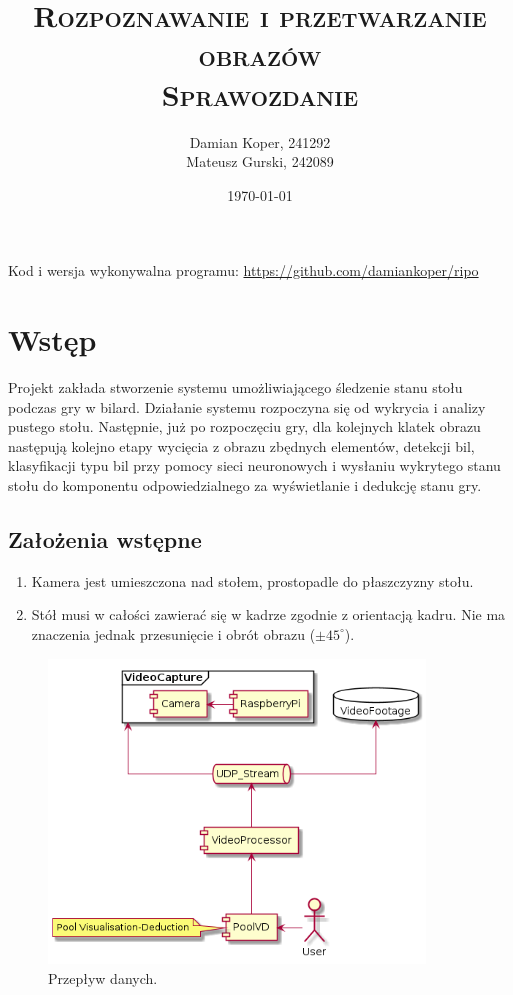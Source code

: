 \documentclass[12pt]{article}
\title{ 
    \vspace*{50mm}
    \textsc{
        \textbf{Rozpoznawanie i przetwarzanie obrazów}\\
        \large Sprawozdanie 
    }
}
\author{
Damian Koper,  241292\\
Mateusz Gurski, 242089
}
\date{\today}
\begin{document}
\maketitle

\newpage
\setcounter{tocdepth}{2}
\localtableofcontents
\listoffigures 
\lstlistoflistings
\vfill
Kod i wersja wykonywalna programu: \url{https://github.com/damiankoper/ripo}
\newpage

\section{Wstęp}
Projekt zakłada stworzenie systemu umożliwiającego śledzenie stanu stołu podczas gry w bilard. Działanie systemu rozpoczyna się od
wykrycia i analizy pustego stołu. Następnie, już po rozpoczęciu gry, dla kolejnych klatek obrazu następują kolejno etapy wycięcia z obrazu zbędnych elementów,
detekcji bil, klasyfikacji typu bil przy pomocy sieci neuronowych i wysłaniu wykrytego stanu stołu do komponentu odpowiedzialnego za wyświetlanie i dedukcję stanu gry.


\subsection{Założenia wstępne}
\begin{enumerate}[noitemsep]
    \item Kamera jest umieszczona nad stołem, prostopadle do płaszczyzny stołu.
    \item Stół musi w całości zawierać się w kadrze zgodnie z orientacją kadru. Nie ma znaczenia jednak przesunięcie i obrót obrazu ($\pm45^\circ$).
\end{enumerate}

\vspace{2cm}

\begin{figure}[H]
    \centering
    \includegraphics[width=10cm]{./diagrams/out/data_flow.png}
    \caption{Przepływ danych.}
    \label{}
\end{figure}
\end{document}
